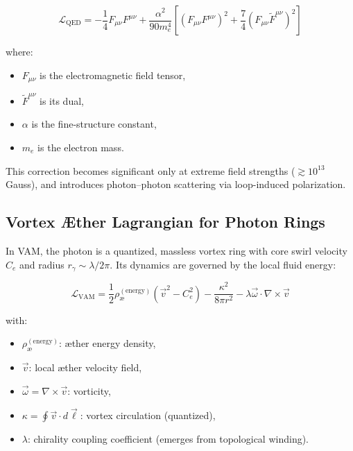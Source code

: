     \begin{equation}
        \mathcal{L}_{\text{QED}} = -\frac{1}{4} F_{\mu\nu} F^{\mu\nu} + \frac{\alpha^2}{90 m_e^4} \left[ (F_{\mu\nu} F^{\mu\nu})^2 + \frac{7}{4} (F_{\mu\nu} \tilde{F}^{\mu\nu})^2 \right]
        \label{eq:euler-heisenberg}
    \end{equation}

    where:
    \begin{itemize}
        \item $F_{\mu\nu}$ is the electromagnetic field tensor,
        \item $\tilde{F}^{\mu\nu}$ is its dual,
        \item $\alpha$ is the fine-structure constant,
        \item $m_e$ is the electron mass.
    \end{itemize}

    This correction becomes significant only at extreme field strengths ($\gtrsim 10^{13}$ Gauss), and introduces photon–photon scattering via loop-induced polarization.

    \subsection{Vortex Æther Lagrangian for Photon Rings}

    In VAM, the photon is a quantized, massless vortex ring with core swirl velocity \( C_e \) and radius \( r_\gamma \sim \lambda / 2\pi \). Its dynamics are governed by the local fluid energy:

    \begin{equation}
        \mathcal{L}_{\text{VAM}} = \frac{1}{2} \rho_\text{\ae}^{(\text{energy})} \left( \vec{v}^2 - C_e^2 \right) - \frac{\kappa^2}{8\pi r^2} - \lambda \vec{\omega} \cdot \nabla \times \vec{v}
        \label{eq:vam-lagrangian}
    \end{equation}

    with:
    \begin{itemize}
        \item \( \rho_\text{\ae}^{(\text{energy})} \): æther energy density,
        \item \( \vec{v} \): local æther velocity field,
        \item \( \vec{\omega} = \nabla \times \vec{v} \): vorticity,
        \item \( \kappa = \oint \vec{v} \cdot d\vec{\ell} \): vortex circulation (quantized),
        \item \( \lambda \): chirality coupling coefficient (emerges from topological winding).
    \end{itemize}

